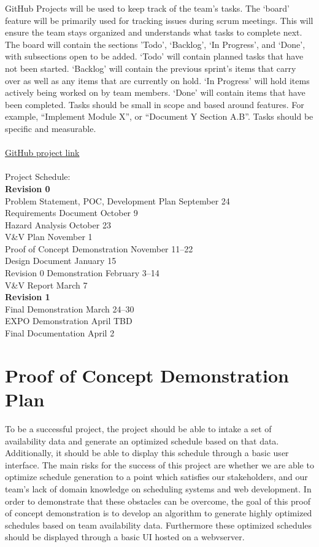 \documentclass{article}
\begin{document}
GitHub Projects will be used to keep track of the team’s tasks. The ‘board’ feature will be primarily used for tracking issues during scrum meetings. This will ensure the team stays organized and understands what tasks to complete next.
The board will contain the sections ’Todo’, ‘Backlog’, ‘In Progress’, and ‘Done’, with subsections open to be added. ‘Todo’ will contain planned tasks that have not been started. ‘Backlog’ will contain the previous sprint’s items that carry over as well as any items that are currently on hold. ‘In Progress’ will hold items actively being worked on by team members. ‘Done’ will contain items that have been completed.
Tasks should be small in scope and based around features. For example, “Implement Module X”, or “Document Y Section A.B”. Tasks should be specific and measurable.
\\\\
\href{https://github.com/users/Nicholas-Fabugais-Inaba/projects/3}{GitHub project link}
\\\\
Project Schedule:\\
\indent \textbf{Revision 0}\\
\indent Problem Statement, POC, Development Plan \hfill September 24\\
\indent Requirements Document \hfill October 9\\
\indent Hazard Analysis \hfill October 23\\
\indent V\&V Plan \hfill November 1\\
\indent Proof of Concept Demonstration \hfill November 11--22\\
\indent Design Document \hfill January 15\\
\indent Revision 0 Demonstration \hfill February 3--14\\
\indent V\&V Report \hfill March 7\\
\indent \textbf{Revision 1}\\
\indent Final Demonstration \hfill March 24--30\\
\indent EXPO Demonstration \hfill April TBD\\
\indent Final Documentation \hfill April 2\\

\section{Proof of Concept Demonstration Plan}

To be a successful project, the project should be able to intake a set of 
availability data and generate an optimized schedule based on that data. 
Additionally, it should be able to display this schedule through a basic
user interface. The main risks for the success of this project are whether 
we are able to optimize schedule generation to a point which satisfies our 
stakeholders, and our team's lack of domain knowledge on scheduling systems 
and web development. In order to demonstrate that these obstacles can be 
overcome, the goal of this proof of concept demonstration is to develop
an algorithm to generate highly optimized schedules based on team availability 
data. Furthermore these optimized schedules should be displayed through a 
basic UI hosted on a webvserver.
\end{document}
